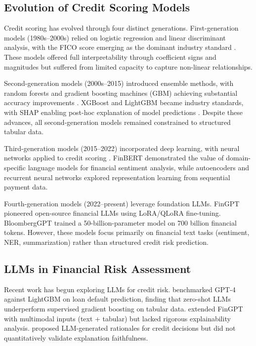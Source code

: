 \documentclass[11pt,a4paper]{article}
\begin{document}
\subsection{Evolution of Credit Scoring Models}

Credit scoring has evolved through four distinct generations. First-generation models (1980s--2000s) relied on logistic regression and linear discriminant analysis, with the FICO score emerging as the dominant industry standard \citep{hand1997construction}. These models offered full interpretability through coefficient signs and magnitudes but suffered from limited capacity to capture non-linear relationships.

Second-generation models (2000s--2015) introduced ensemble methods, with random forests and gradient boosting machines (GBM) achieving substantial accuracy improvements \citep{lessmann2015benchmarking}. XGBoost \citep{chen2016xgboost} and LightGBM \citep{ke2017lightgbm} became industry standards, with SHAP enabling post-hoc explanation of model predictions \citep{lundberg2017shap}. Despite these advances, all second-generation models remained constrained to structured tabular data.

Third-generation models (2015--2022) incorporated deep learning, with neural networks applied to credit scoring \citep{koenigsberger2017value}. FinBERT \citep{araci2019finbert} demonstrated the value of domain-specific language models for financial sentiment analysis, while autoencoders and recurrent neural networks explored representation learning from sequential payment data.

Fourth-generation models (2022--present) leverage foundation LLMs. FinGPT \citep{yang2023fingpt} pioneered open-source financial LLMs using LoRA/QLoRA fine-tuning. BloombergGPT \citep{wu2023bloomberggpt} trained a 50-billion-parameter model on 700 billion financial tokens. However, these models focus primarily on financial text tasks (sentiment, NER, summarization) rather than structured credit risk prediction.

\subsection{LLMs in Financial Risk Assessment}

Recent work has begun exploring LLMs for credit risk. \citet{wang2024zeroshot} benchmarked GPT-4 against LightGBM on loan default prediction, finding that zero-shot LLMs underperform supervised gradient boosting on tabular data. \citet{liu2024fingpt} extended FinGPT with multimodal inputs (text + tabular) but lacked rigorous explainability analysis. \citet{zhang2024llm} proposed LLM-generated rationales for credit decisions but did not quantitatively validate explanation faithfulness.
\end{document}

